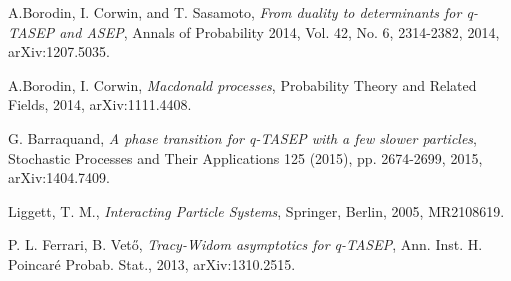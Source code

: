 \begin{singlespace}



\begin{thebibliography}{9}

  A.Borodin, I. Corwin, and T. Sasamoto,
  \emph{From duality to determinants for q-TASEP and ASEP},
  Annals of Probability 2014,
  Vol. 42, No. 6, 2314-2382,
  2014,
  arXiv:1207.5035.

  A.Borodin, I. Corwin,
  \emph{Macdonald processes},
  Probability Theory and Related Fields,
  2014,
  arXiv:1111.4408.

  G. Barraquand,
  \emph{A phase transition for q-TASEP with a few slower particles},
  Stochastic Processes and Their Applications 125 (2015),
  pp. 2674-2699,
  2015,
  arXiv:1404.7409.


  Liggett, T. M.,
  \emph{Interacting Particle Systems},
  Springer,
  Berlin,
  2005,
  MR2108619.

  P. L. Ferrari, B. Vet\H o,
  \emph{Tracy-Widom asymptotics for q-TASEP},
  Ann. Inst. H. Poincar\' e Probab. Stat.,
  2013,
  arXiv:1310.2515.

\end{thebibliography}

\end{singlespace}
